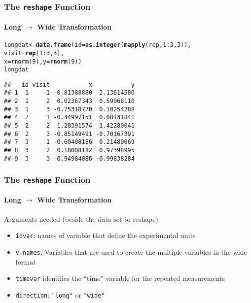\documentclass[paper=screen,mathserif]{beamer}\usepackage[]{graphicx}\usepackage[]{color}
\makeatletter
\newcommand{\hlnum}[1]{\textcolor[rgb]{0.686,0.059,0.569}{#1}}%
\newcommand{\hlopt}[1]{\textcolor[rgb]{0,0,0}{#1}}%
\newcommand{\hlstd}[1]{\textcolor[rgb]{0.345,0.345,0.345}{#1}}%
\newcommand{\hlkwb}[1]{\textcolor[rgb]{0.69,0.353,0.396}{#1}}%
\newcommand{\hlkwc}[1]{\textcolor[rgb]{0.333,0.667,0.333}{#1}}%
\newcommand{\hlkwd}[1]{\textcolor[rgb]{0.737,0.353,0.396}{\textbf{#1}}}%
\newenvironment{kframe}{%
 \def\at@end@of@kframe{}%
 \ifinner\ifhmode%
  \def\at@end@of@kframe{\end{minipage}}%
  \begin{minipage}{\columnwidth}%
 \fi\fi%
 \def\FrameCommand##1{\hskip\@totalleftmargin \hskip-\fboxsep
 \colorbox{shadecolor}{##1}\hskip-\fboxsep
     \hskip-\linewidth \hskip-\@totalleftmargin \hskip\columnwidth}%
 \MakeFramed {\advance\hsize-\width
   \@totalleftmargin\z@ \linewidth\hsize
   \@setminipage}}%
 {\par\unskip\endMakeFramed%
 \at@end@of@kframe}
\newenvironment{knitrout}{}{} %
\newcommand{\ft}[1]{\frametitle{#1}}
\newcommand{\fst}[1]{\framesubtitle{#1}}
\makeatother
\begin{document}
\begin{frame}[fragile]
  \ft{The {\tt reshape} Function}
  \fst{Long $\rightarrow$ Wide Transformation}

\begin{knitrout}\scriptsize
{}\color{fgcolor}\begin{kframe}
\begin{alltt}
\hlstd{longdat} \hlkwb{<-} \hlkwd{data.frame}\hlstd{(}\hlkwc{id} \hlstd{=} \hlkwd{as.integer}\hlstd{(}\hlkwd{mapply}\hlstd{(rep,} \hlnum{1}\hlopt{:}\hlnum{3}\hlstd{,} \hlnum{3}\hlstd{)),}
                      \hlkwc{visit} \hlstd{=} \hlkwd{rep}\hlstd{(}\hlnum{1}\hlopt{:}\hlnum{3}\hlstd{,} \hlnum{3}\hlstd{),}
                      \hlkwc{x} \hlstd{=} \hlkwd{rnorm}\hlstd{(}\hlnum{9}\hlstd{),} \hlkwc{y} \hlstd{=} \hlkwd{rnorm}\hlstd{(}\hlnum{9}\hlstd{))}
\hlstd{longdat}
\end{alltt}
\begin{verbatim}
##   id visit           x           y
## 1  1     1 -0.81388880  2.13614580
## 2  1     2  0.02367343  0.59968110
## 3  1     3 -0.75318770  0.10254288
## 4  2     1 -0.44997151  0.08131841
## 5  2     2  1.20391574  1.42280041
## 6  2     3 -0.85149491 -0.70167391
## 7  3     1 -0.60408186  0.21489069
## 8  3     2  0.18008182  0.97398995
## 9  3     3 -0.94984086 -0.99838284
\end{verbatim}
\end{kframe}
\end{knitrout}

\end{frame}

\begin{frame}[fragile]
  \ft{The {\tt reshape} Function}
  \fst{Long $\rightarrow$ Wide Transformation}
  
  Arguments needed (beside the data set to reshape)
  \begin{itemize}
  \item \verb=idvar=: names of variable that define the experimental
    units
  \item \verb=v.names=: Variables that are used to create the multiple
    variables in the wide format
  \item \verb=timevar= identifies the ``time'' variable for the
    repeated measurements
  \item \verb=direction=: \verb="long"= or \verb="wide"=
  \end{itemize}

\end{frame}
\end{document}
